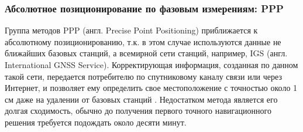 \subsubsection{Абсолютное позиционирование по фазовым измерениям: PPP}

Группа методов PPP (англ. Precise Point Positioning) приближается к абсолютному позиционированию, т.к. в этом случае используются данные не ближайших базовых станций, а всемирной сети станций, например, IGS (англ. International GNSS Service).
Корректирующая информация, созданная по данном такой сети, передается потребителю по спутниковому каналу связи или через Интернет, и позволяет ему определить свое местоположение с точностью около 1 см даже на удалении от базовых станций \cite{basile2018}. 
Недостатком метода является его долгая сходимость, обычно до получения первого точного навигационного решения требуется подождать около десяти минут.






